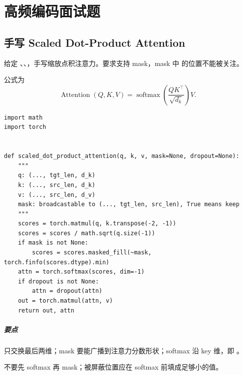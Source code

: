 \chapter{高频编码面试题}

\section{手写 Scaled Dot-Product Attention}
\begin{interview}
给定 、、，手写缩放点积注意力。要求支持 mask，mask 中  的位置不能被关注。
\end{interview}
\begin{answer}
公式为
\[
  \operatorname{Attention}(Q,K,V)=\operatorname{softmax}\left(\frac{QK^\top}{\sqrt{d_k}}\right)V.
\]
\begin{lstlisting}
import math
import torch


def scaled_dot_product_attention(q, k, v, mask=None, dropout=None):
    """
    q: (..., tgt_len, d_k)
    k: (..., src_len, d_k)
    v: (..., src_len, d_v)
    mask: broadcastable to (..., tgt_len, src_len), True means keep
    """
    scores = torch.matmul(q, k.transpose(-2, -1))
    scores = scores / math.sqrt(q.size(-1))
    if mask is not None:
        scores = scores.masked_fill(~mask, torch.finfo(scores.dtype).min)
    attn = torch.softmax(scores, dim=-1)
    if dropout is not None:
        attn = dropout(attn)
    out = torch.matmul(attn, v)
    return out, attn
\end{lstlisting}
\paragraph{要点}  只交换最后两维；mask 要能广播到注意力分数形状；softmax 沿 key 维，即 。
\end{answer}
\begin{trap}
不要先 softmax 再 mask；被屏蔽位置应在 softmax 前填成足够小的值。
\end{trap}

